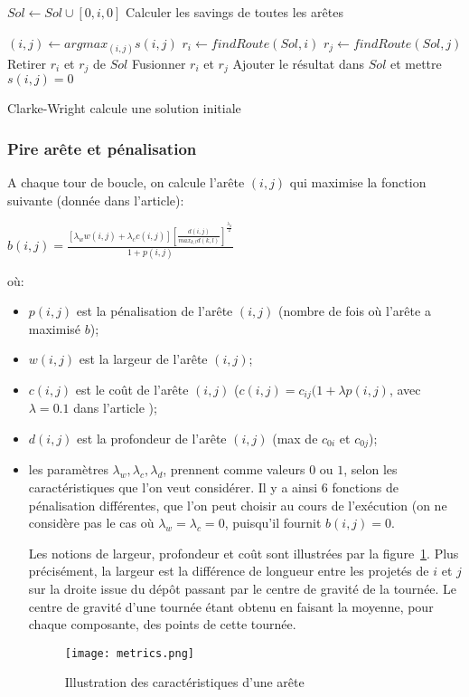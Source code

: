\documentclass[a4paper,11pt]{article}%
\begin{document}
\begin{algorithm}
\DontPrintSemicolon %

 {
	$Sol \gets Sol \cup [0,i,0]$\;
}
Calculer les savings de toutes les arêtes\;

 {
	$(i,j) \gets argmax_{(i,j)} s(i,j)$\;
	$r_i \gets findRoute(Sol,i)$\;
	$r_j \gets findRoute(Sol,j)$\;
	 {
		Retirer $r_i$ et $r_j$ de $Sol$\;
		Fusionner $r_i$ et $r_j$\;
		Ajouter le résultat dans $Sol$ et mettre $s(i,j) = 0$\;
	}
}

\;
\caption{{\sc Clarke-Wright} calcule une solution initiale}
\label{algo:CW}
\end{algorithm}

\subsubsection{Pire arête et pénalisation}
A chaque tour de boucle, on calcule l'arête $(i,j)$ qui maximise la fonction suivante (donnée dans l'article):
\begin{center}
$b(i,j) = \frac{[\lambda_w w(i,j) + \lambda_c c(i,j)] [\frac{d(i,j)}{max_{k,l}d(k,l)}] ^ {\frac{\lambda_d}{2}}}{1+p(i,j)}$
\end{center}
où:
\begin{itemize}
\item $p(i,j)$ est la pénalisation de l'arête $(i,j)$ (nombre de fois où l'arête a maximisé $b$);
\item $w(i,j)$ est la largeur de l'arête $(i,j)$;
\item $c(i,j)$ est le coût de l'arête $(i,j)$ ($c(i,j) = c_{ij}(1 + \lambda p(i,j)$, avec $\lambda = 0.1$ dans l'article \cite{Sorensen_2017});
\item $d(i,j)$ est la profondeur de l'arête $(i,j)$ (max de $c_{0i}$ et $c_{0j}$);
\item les paramètres $\lambda_w,\lambda_c,\lambda_d$, prennent comme valeurs $0$ ou $1$, selon les caractéristiques que l'on veut considérer. 
Il y a ainsi 6 fonctions de pénalisation différentes, que l'on peut choisir au cours de l'exécution (on ne considère pas le cas où $\lambda_w = \lambda_c = 0$, puisqu'il fournit $b(i,j) = 0$.

Les notions de largeur, profondeur et coût sont illustrées par la figure~\ref{metrics}. 
Plus précisément, la largeur est la différence de longueur entre les projetés de $i$ et $j$ sur la droite issue du dépôt passant par le centre de gravité de la tournée. 
Le centre de gravité d'une tournée étant obtenu en faisant la moyenne, pour chaque composante, des points de cette tournée.

\begin{figure}
\centering
\texttt{[image: metrics.png]}
\caption{Illustration des caractéristiques d'une arête}
\label{metrics}
\end{figure}

\end{itemize}
\end{document}
